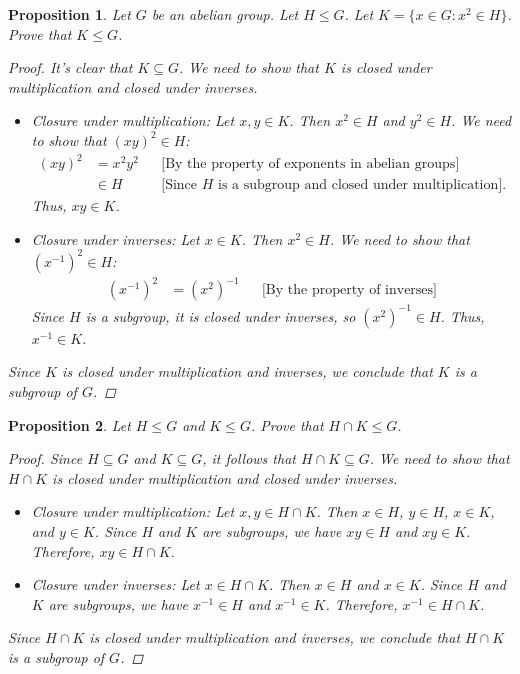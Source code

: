 \documentclass[12pt]{article}
\newtheorem{proposition}{Proposition}
\begin{document}
\begin{proposition}
  Let $G$ be an abelian group. Let $H \leqslant G$. Let $K = \{x \in G : x^2 \in H\}$.
  Prove that $K \leqslant G$.
  \begin{proof}
    It's clear that $K \subseteq G$. We need to show that $K$ is closed under multiplication and closed under inverses.
    \begin{itemize}
      \item Closure under multiplication: Let $x, y \in K$. Then $x^2 \in H$ and $y^2 \in H$.
            We need to show that $(xy)^2 \in H$:
            \begin{align*}
              (xy)^2 & = x^2y^2 &  & \text{[By the property of exponents in abelian groups]}                  \\
                     & \in H    &  & \text{[Since } H \text{ is a subgroup and closed under multiplication]}.
            \end{align*}
            Thus, $xy \in K$.
      \item Closure under inverses: Let $x \in K$. Then $x^2 \in H$.
            We need to show that $(x^{-1})^2 \in H$:
            \begin{align*}
              (x^{-1})^2 & = (x^2)^{-1} &  & \text{[By the property of inverses]}
            \end{align*}
            Since $H$ is a subgroup, it is closed under inverses, so $(x^2)^{-1} \in H$.
            Thus, $x^{-1} \in K$.
    \end{itemize}
    Since $K$ is closed under multiplication and inverses, we conclude that $K$ is a subgroup of $G$.
  \end{proof}
\end{proposition}


\begin{proposition}
  Let $H \leqslant G$ and $K \leqslant G$.
  Prove that $H \cap K \leqslant G$.
  \begin{proof}
    Since $H \subseteq G$ and $K \subseteq G$, it follows that $H \cap K \subseteq G$.
    We need to show that $H \cap K$ is closed under multiplication and closed under inverses.
    \begin{itemize}
      \item  Closure under multiplication: Let $x, y \in H \cap K$.
            Then $x \in H$, $y \in H$, $x \in K$, and $y \in K$.
            Since $H$ and $K$ are subgroups, we have $xy \in H$ and $xy \in K$.
            Therefore, $xy \in H \cap K$.
      \item Closure under inverses: Let $x \in H \cap K$.
            Then $x \in H$ and $x \in K$.
            Since $H$ and $K$ are subgroups, we have $x^{-1} \in H$ and $x^{-1} \in K$.
            Therefore, $x^{-1} \in H \cap K$.
    \end{itemize}
    Since $H \cap K$ is closed under multiplication and inverses, we conclude that $H \cap K$ is a subgroup of $G$.
  \end{proof}
\end{proposition}
\end{document}
